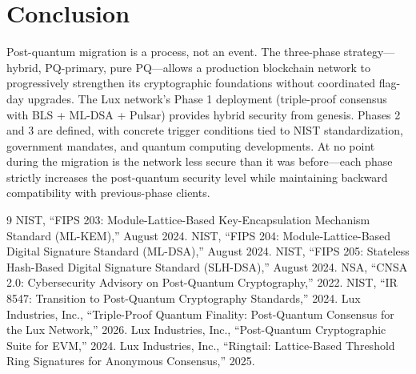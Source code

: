 \section{Conclusion}


Post-quantum migration is a process, not an event. The three-phase strategy---hybrid, PQ-primary, pure PQ---allows a production blockchain network to progressively strengthen its cryptographic foundations without coordinated flag-day upgrades. The Lux network's Phase 1 deployment (triple-proof consensus with BLS + ML-DSA + Pulsar) provides hybrid security from genesis. Phases 2 and 3 are defined, with concrete trigger conditions tied to NIST standardization, government mandates, and quantum computing developments. At no point during the migration is the network less secure than it was before---each phase strictly increases the post-quantum security level while maintaining backward compatibility with previous-phase clients.

\begin{thebibliography}{9}
 NIST, ``FIPS 203: Module-Lattice-Based Key-Encapsulation Mechanism Standard (ML-KEM),'' August 2024.
 NIST, ``FIPS 204: Module-Lattice-Based Digital Signature Standard (ML-DSA),'' August 2024.
 NIST, ``FIPS 205: Stateless Hash-Based Digital Signature Standard (SLH-DSA),'' August 2024.
 NSA, ``CNSA 2.0: Cybersecurity Advisory on Post-Quantum Cryptography,'' 2022.
 NIST, ``IR 8547: Transition to Post-Quantum Cryptography Standards,'' 2024.
 Lux Industries, Inc., ``Triple-Proof Quantum Finality: Post-Quantum Consensus for the Lux Network,'' 2026.
 Lux Industries, Inc., ``Post-Quantum Cryptographic Suite for EVM,'' 2024.
 Lux Industries, Inc., ``Ringtail: Lattice-Based Threshold Ring Signatures for Anonymous Consensus,'' 2025.
\end{thebibliography}


